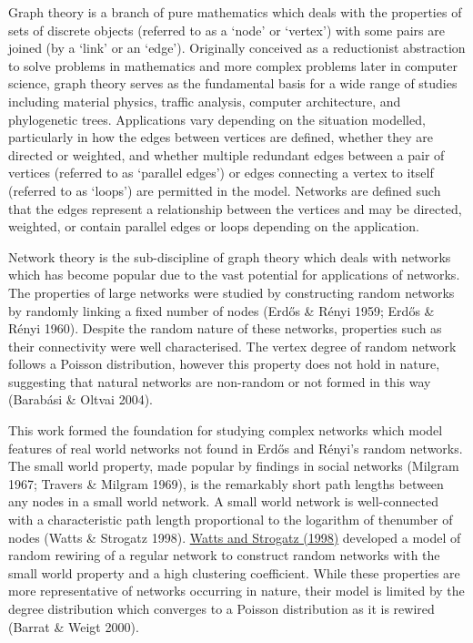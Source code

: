Graph theory is a branch of pure mathematics which deals with the properties of sets of discrete objects (referred to as a {\textquoteleft}node{\textquoteright} or {\textquoteleft}vertex{\textquoteright}) with some pairs are joined (by a {\textquoteleft}link{\textquoteright} or an {\textquoteleft}edge{\textquoteright}). Originally conceived as a reductionist abstraction to solve problems in mathematics and more complex problems later in computer science, graph theory serves as the fundamental basis for a wide range of studies including material physics, traffic analysis, computer architecture, and phylogenetic trees. Applications vary depending on the situation modelled, particularly in how the edges between vertices are defined, whether they are directed or weighted, and whether multiple redundant edges between a pair of vertices (referred to as {\textquoteleft}parallel edges{\textquoteright}) or edges connecting a vertex to itself (referred to as {\textquoteleft}loops{\textquoteright}) are permitted in the model. Networks are defined such that the edges represent a relationship between the vertices and may be directed, weighted, or contain parallel edges or loops depending on the application. 

Network theory is the sub-discipline of graph theory which deals with networks which has become popular due to the vast potential for applications of networks. The properties of large networks were studied by constructing random networks by randomly linking a fixed number of nodes (Erd\H{o}s \& R\'enyi 1959; Erd\H{o}s \& R\'enyi 1960). Despite the random nature of these networks, properties such as their connectivity were well characterised. The vertex degree of random network follows a Poisson distribution, however this property does not hold in nature, suggesting that natural networks are non-random or not formed in this way (Barab\'asi \& Oltvai 2004). 


This work formed the foundation for studying complex networks which model features of real world networks not found in Erd\H{o}s and R\'enyi{\textquoteright}s random networks. The small world property, made popular by findings in social networks (Milgram 1967; Travers \& Milgram 1969), is the remarkably short path lengths between any nodes in a small world network. A small world network is well-connected with a characteristic path length proportional to the logarithm of thenumber of nodes (Watts \& Strogatz 1998). \hyperlink{ENREF112}{Watts and Strogatz (1998)} developed a model of random rewiring of a regular network to construct random networks with the small world property and a high clustering coefficient. While these properties are more representative of networks occurring in nature, their model is limited by the degree distribution which converges to a Poisson distribution as it is rewired (Barrat \& Weigt 2000). 


